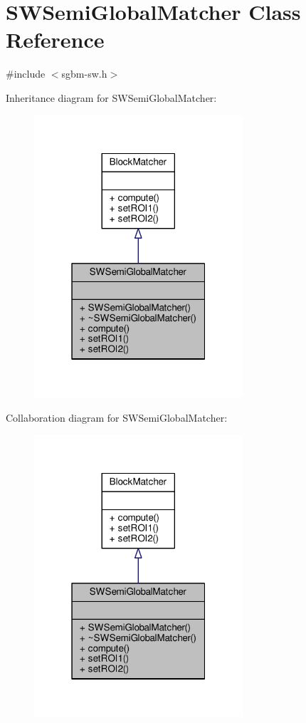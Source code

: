 \hypertarget{classSWSemiGlobalMatcher}{}\section{S\+W\+Semi\+Global\+Matcher Class Reference}
\label{classSWSemiGlobalMatcher}


{\ttfamily \#include $<$sgbm-\/sw.\+h$>$}



Inheritance diagram for S\+W\+Semi\+Global\+Matcher\+:
\nopagebreak
\begin{figure}[H]
\begin{center}
\leavevmode
\includegraphics[width=220pt]{classSWSemiGlobalMatcher__inherit__graph}
\end{center}
\end{figure}


Collaboration diagram for S\+W\+Semi\+Global\+Matcher\+:
\nopagebreak
\begin{figure}[H]
\begin{center}
\leavevmode
\includegraphics[width=220pt]{classSWSemiGlobalMatcher__coll__graph}
\end{center}
\end{figure}
